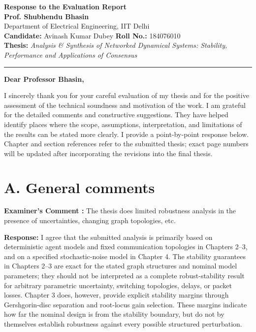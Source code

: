 \documentclass[11pt,a4paper]{article}
\newcounter{examcomment}
\renewcommand{\theexamcomment}{\arabic{examcomment}}
\newcommand{\comment}[1]{%
\refstepcounter{examcomment}%
\par\vspace{5pt}\noindent
\colorbox{gray!13}{%
	\parbox{\dimexpr\linewidth-2\fboxsep}{%
		\textbf{Examiner's Comment \theexamcomment:} #1%
	}%
}%
\par
}
\newcommand{\response}{\par\textbf{Response:} }
\newcommand{\revision}{\par\textbf{Proposed thesis revision:} }
\begin{document}
\begin{center}
    {\Large\bfseries Response to the Evaluation Report}\\[4pt]
    {\large\bfseries Prof. Shubhendu Bhasin}\\
    Department of Electrical Engineering, IIT Delhi\\[8pt]
    \textbf{Candidate:} Avinash Kumar Dubey \qquad
    \textbf{Roll No.:} 184076010\\
    \textbf{Thesis:} \emph{Analysis \& Synthesis of Networked Dynamical Systems: Stability, Performance and Applications of Consensus}
\end{center}
\vspace{4pt}
\hrule
\vspace{8pt}
\textbf{Dear Professor Bhasin,}	

I sincerely thank you for your careful evaluation of my thesis and for the positive assessment of the technical soundness and motivation of the work. I am grateful for the detailed comments and constructive suggestions. They have helped identify places where the scope, assumptions, interpretation, and limitations of the results can be stated more clearly. I provide a point-by-point response below. Chapter and section references refer to the submitted thesis; exact page numbers will be updated after incorporating the revisions into the final thesis.
\section*{A. General comments}
\comment{The thesis does limited robustness analysis in the presence of uncertainties, changing graph topologies, etc.}
\response
I agree that the submitted analysis is primarily based on deterministic agent models and fixed communication topologies in Chapters 2--3, and on a specified stochastic-noise model in Chapter 4. The stability guarantees in Chapters 2--3 are exact for the stated graph structures and nominal model parameters; they should not be interpreted as a complete robust-stability result for arbitrary parametric uncertainty, switching topologies, delays, or packet losses. Chapter 3 does, however, provide explicit stability margins through Gershgorin-disc separation and root-locus gain selection. These margins indicate how far the nominal design is from the stability boundary, but do not by themselves establish robustness against every possible structured perturbation.
\end{document}

